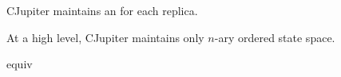 
\begin{frame}{}
  \centerline{\Huge {}}
\end{frame}

\begin{frame}{}
  \begin{center}
    {\large CJupiter maintains an  for each replica.}
  \end{center}

\end{frame}

\begin{frame}{}
  \begin{center}
    \begin{prop}
      {\large At a high level, CJupiter maintains only  $n$-ary ordered state space.}
    \end{prop}

    \resizebox{0.50\textwidth}{!}{}

  \end{center}
\end{frame}

\begin{frame}{}
  \begin{Theorem}[Equivalence]
    equiv
  \end{Theorem}
\end{frame}

\begin{frame}{}
\end{frame}
